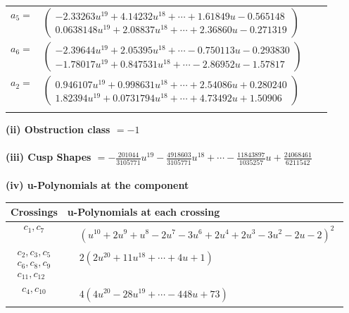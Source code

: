 \documentclass[1p]{elsarticle_modified}
\theoremstyle{definition}
\begin{document}
\begin{tabular}{m{7pt} m{180pt} m{7pt} m{180pt} }
\flushright $a_{5}=$&$\begin{pmatrix}-2.33263 u^{19}+4.14232 u^{18}+\cdots+1.61849 u-0.565148\\0.0638148 u^{19}+2.08837 u^{18}+\cdots+2.36860 u-0.271319\end{pmatrix}$ \\
\flushright $a_{6}=$&$\begin{pmatrix}-2.39644 u^{19}+2.05395 u^{18}+\cdots-0.750113 u-0.293830\\-1.78017 u^{19}+0.847531 u^{18}+\cdots-2.86952 u-1.57817\end{pmatrix}$ \\
\flushright $a_{2}=$&$\begin{pmatrix}0.946107 u^{19}+0.998631 u^{18}+\cdots+2.54086 u+0.280240\\1.82394 u^{19}+0.0731794 u^{18}+\cdots+4.73492 u+1.50906\end{pmatrix}$\\&\end{tabular}
\flushleft \textbf{(ii) Obstruction class $= -1$}\\~\\
\flushleft \textbf{(iii) Cusp Shapes $= -\frac{201044}{3105771} u^{19}-\frac{4918603}{3105771} u^{18}+\cdots-\frac{11843897}{1035257} u+\frac{24068461}{6211542}$}\\~\\
\newpage\renewcommand{\arraystretch}{1}
\flushleft \textbf{(iv) u-Polynomials at the component}\newline \\
\begin{tabular}{m{50pt}|m{274pt}}
Crossings & \hspace{64pt}u-Polynomials at each crossing \\
\hline $$\begin{aligned}c_{1},c_{7}\end{aligned}$$&$\begin{aligned}
&(u^{10}+2 u^9+u^8-2 u^7-3 u^6+2 u^4+2 u^3-3 u^2-2 u-2)^2
\end{aligned}$\\
\hline $$\begin{aligned}c_{2},c_{3},c_{5}\\c_{6},c_{8},c_{9}\\c_{11},c_{12}\end{aligned}$$&$\begin{aligned}
&2(2 u^{20}+11 u^{18}+\cdots+4 u+1)
\end{aligned}$\\
\hline $$\begin{aligned}c_{4},c_{10}\end{aligned}$$&$\begin{aligned}
&4(4 u^{20}-28 u^{19}+\cdots-448 u+73)
\end{aligned}$\\
\hline
\end{tabular}\\~\\
\end{document}
